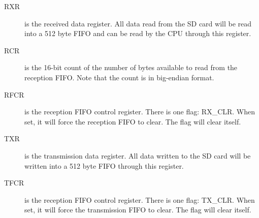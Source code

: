 \begin{description}
    \item[RXR] is the received data register. All data read from the SD card will be read into a 512 byte FIFO and can be read by the CPU through this register.

    \item[RCR] is the 16-bit count of the number of bytes available to read from the reception FIFO. Note that the count is in big-endian format.

    \item[RFCR] is the reception FIFO control register. There is one flag: RX\_CLR. When set, it will force the reception FIFO to clear. The flag will clear itself.

    \item[TXR] is the transmission data register. All data written to the SD card will be written into a 512 byte FIFO through this register.

    \item[TFCR] is the reception FIFO control register. There is one flag: TX\_CLR. When set, it will force the transmission FIFO to clear. The flag will clear itself.

\end{description}
